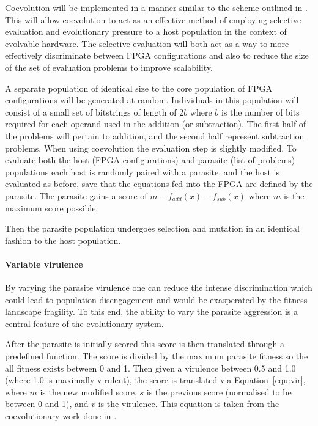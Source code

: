 Coevolution will be implemented in a manner similar to the scheme outlined in
\cite{6790490}.
This will allow coevolution to act as an effective method of employing selective
evaluation and evolutionary pressure to a host population in the context of
evolvable hardware. The selective evaluation will both act as a way to more effectively
discriminate between FPGA configurations and also to reduce the size of the
set of evaluation problems to improve scalability.

A separate population of identical size to the core population of FPGA configurations
will be generated at random. Individuals in this population will consist of a small set
of bitstrings of length of $2b$ where $b$ is the number of bits required for
each operand used in the addition (or subtraction). The first half of the problems
will pertain to addition, and the second half represent subtraction problems.
When using coevolution the
evaluation step is slightly modified. To evaluate both the host (FPGA
configurations) and parasite (list of problems) populations each host is randomly
paired with a parasite, and the host is evaluated as before, save that the equations
fed into the FPGA are defined by
the parasite. The parasite gains a score of $m - f_{add}(x) - f_{sub}(x)$ where
$m$ is the maximum score possible.

Then the parasite population undergoes selection and mutation in an identical
fashion to the host population.

\paragraph{Variable virulence}
By varying the parasite virulence one can reduce the intense discrimination
which could lead to population disengagement and would be exasperated by the
fitness landscape fragility. To this end, the ability to vary the parasite
aggression is a central feature of the evolutionary system.

After the parasite is initially scored this score is then translated through
a predefined function. The score is divided by the maximum parasite fitness so
the all fitness exists between 0 and 1. Then given a virulence
between 0.5 and 1.0 (where 1.0 is maximally virulent), the score is translated
via Equation~\ref{equ:vir}, where $m$ is the new modified score, $s$ is the
previous score (normalised to be between 0 and 1), and $v$ is the virulence.
This equation is taken from the coevolutionary work done in \cite{6790490}.

